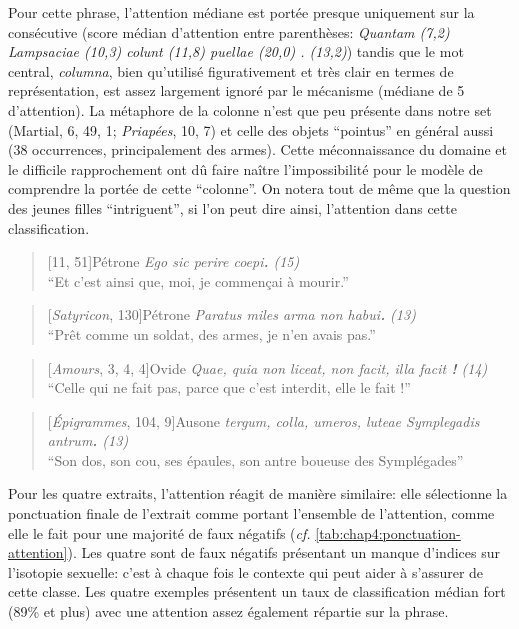 Pour cette phrase, l'attention médiane est portée presque uniquement sur la consécutive (score médian d'attention entre parenthèses: \textit{Quantam (7,2) Lampsaciae (10,3) colunt (11,8) puellae (20,0) . (13,2)}) tandis que le mot central, \textit{columna}, bien qu'utilisé figurativement et très clair en termes de représentation, est assez largement ignoré par le mécanisme (médiane de 5 d'attention). La métaphore de la colonne n'est que peu présente dans notre set (Martial, 6, 49, 1; \textit{Priapées}, 10, 7) et celle des objets ``pointus'' en général aussi (38 occurrences, principalement des armes). Cette méconnaissance du domaine et le difficile rapprochement ont dû faire naître l'impossibilité pour le modèle de comprendre la portée de cette ``colonne''. On notera  tout de même que la question des jeunes filles ``intriguent'', si l'on peut dire ainsi, l'attention dans cette classification.

\begin{quote}[11, 51]{Pétrone}
    \textit{Ego sic perire coepi\textbf{.} (15)}\\
    \enquote{Et c'est ainsi que, moi, je commençai à mourir.}
\end{quote}

\begin{quote}[\textit{Satyricon}, 130]{Pétrone}
    \textit{Paratus miles arma non habui\textbf{.} (13)} \\
    \enquote{Prêt comme un soldat, des armes, je n'en avais pas.}
\end{quote}

\begin{quote}[\textit{Amours}, 3, 4, 4]{Ovide}
    \textit{Quae, quia non liceat, non facit, illa facit \textbf{!} (14) }\\
    \enquote{Celle qui ne fait pas, parce que c'est interdit, elle le fait !}
\end{quote}


\begin{quote}[\textit{Épigrammes}, 104, 9]{Ausone}
    \textit{tergum, colla, umeros, luteae Symplegadis antrum\textbf{.} (13) } \\
    \enquote{Son dos, son cou, ses épaules, son antre boueuse des Symplégades}
\end{quote}

Pour les quatre extraits, l'attention réagit de manière similaire: elle sélectionne la ponctuation finale de l'extrait comme portant l'ensemble de l'attention, comme elle le fait pour une majorité de faux négatifs (\textit{cf.} \ref{tab:chap4:ponctuation-attention}). Les quatre sont de faux négatifs présentant un manque d'indices sur l'isotopie sexuelle: c'est à chaque fois le contexte qui peut aider à s'assurer de cette classe. Les quatre exemples présentent un taux de classification médian fort (89\% et plus) avec une attention assez également répartie sur la phrase.

